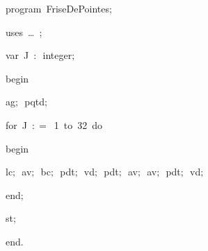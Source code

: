
{
\parindent {}
\medskip

\carrenoir
\vspace{\neglskip}\mbox{\blc  \idt  \mcl program\idt \ FriseDePointes$;$
}\par 
\vspace{\neglskip}\mbox{\blc \blk\idt \mcl uses\idt \ \ldots\ $;$
}\par 
\pagebreak[3] 
\vspace{\neglskip}\mbox{\blc  \blk\idt  \mcl var\idt \ J\ $:$\ integer$;$}\par 
\vspace{\neglskip}\mbox{\blc  \idt  \mcl begin\idt \ }\par 
\vspace{\neglskip}\mbox{\blc  \blk\idt  ag$;$\ pqtd$;$\ }\par 
\pagebreak[3] 
\vspace{\neglskip}\mbox{\blc  \blk\idt  \mcl for\idt \ J\ $:$$=$\ 1\ \mcl to\idt \ 32\ \mcl do\idt }\par 
\vspace{\neglskip}\mbox{\blc  \blk\blk\idt  \mcl begin\idt }\par 
\vspace{\neglskip}\mbox{\blc  \blk\blk\blk\idt  lc$;$\ av$;$\ bc$;$\ pdt$;$\ vd$;$\ pdt$;$\ av$;$\ av$;$\ pdt$;$\ vd$;$\ }\par 
\vspace{\neglskip}\mbox{\blc  \blk\blk\idt  \mcl end\idt $;$}\par 
\vspace{\neglskip}\mbox{\blc  \blk\idt  st$;$}\par 
\vspace{\neglskip}\mbox{\blc  \idt  \mcl end\idt $.$}\par 

\medskip }

